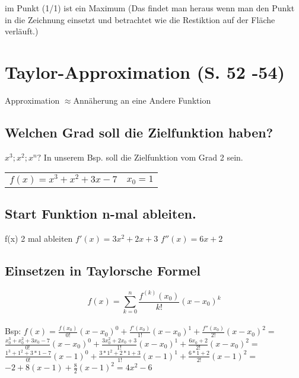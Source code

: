 \documentclass[a4paper, 11pt]{article}
\begin{document}
im Punkt (1/1) ist ein Maximum \newline
\newline (Das findet man heraus wenn man den Punkt in die Zeichnung einsetzt und betrachtet wie die Restiktion auf der Fläche verläuft.)

\section { Taylor-Approximation (S. 52 -54)}

Approximation $\approx $Annäherung an eine Andere Funktion 


\subsection {Welchen Grad soll die Zielfunktion haben?}

$x^3; x^2; x^n ? $\newline
\newline In unserem Bsp. soll die Zielfunktion vom Grad 2 sein.\\
\newline \begin{tabular}{l r}
	$f(x)=x^3+x^2+3x-7$ & $x_0=1$\\
\end{tabular}


\subsection {Start Funktion n-mal ableiten.}

f(x) 2 mal ableiten\newline
\newline
$f'(x) = 3x^2 + 2x + 3$\newline
$f''(x) = 6x + 2$


\subsection {Einsetzen in Taylorsche Formel}

\begin{equation*} f(x) = \sum_{k=0}^n \frac {f^{(k)}(x_0)}{k!}(x -
x_0)^k\end{equation*}\\
Bsp:\newline				
$f(x) = \frac {f(x_0)}{0!} (x - x_0)^0 + \frac {f'(x_0)}{1!} (x - x_0)^1 + \frac {f''(x_0)}{2!} (x - x_0)^2 =$\newline
\newline $\frac {x_0^3 + x_0^2 + 3x_0 - 7}{0!} (x - x_0)^0 + \frac {3x_0^2 + 2x_0 + 3}{1!} (x - x_0)^1 + \frac {6x_0 + 2}{2!} (x - x_0)^2 = $\newline
\newline $\frac {1^3 + 1^2 + 3 * 1 - 7}{0!} (x - 1)^0 + \frac {3 *1^2 + 2*1 + 3}{1!} (x - 1)^1 + \frac {6 * 1 + 2}{2!} (x - 1)^2 = $\newline
\newline $-2+8(x-1)+\frac 8 2 (x-1)^2 = 4x^2 - 6$
\end{document}
